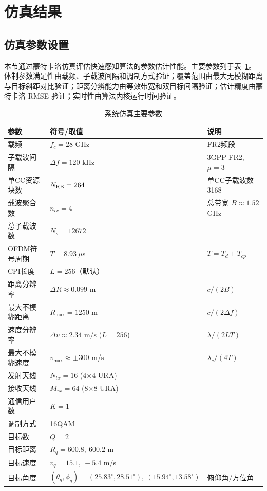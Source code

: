 \section{仿真结果}

\subsection{仿真参数设置}

本节通过蒙特卡洛仿真评估快速感知算法的参数估计性能。主要参数列于表~\ref{tab:sim_params}。
体制参数满足性由载频、子载波间隔和调制方式验证；覆盖范围由最大无模糊距离与目标斜距对比验证；距离分辨能力由等效带宽和双目标间隔验证；估计精度由蒙特卡洛 RMSE 验证；实时性由算法内核运行时间验证。

\begin{table}[H]
\centering
\caption{系统仿真主要参数}
\label{tab:sim_params}
\begin{tabular}{lll}
\toprule
\textbf{参数} & \textbf{符号/取值} & \textbf{说明} \\
\midrule
载频          & $f_c = 28$ GHz & FR2频段 \\
子载波间隔    & $\Delta f = 120$ kHz & 3GPP FR2, $\mu=3$ \\
单CC资源块数  & $N_{\rm RB}=264$ & 单CC子载波数3168 \\
载波聚合数    & $n_{cc}=4$ & 总带宽 $B\approx1.52$ GHz \\
总子载波数    & $N_s = 12672$ & \\
OFDM符号周期 & $T = 8.93\ \mu$s & $T=T_d+T_{cp}$ \\
CPI长度       & $L = 256$（默认） &  \\
距离分辨率    & $\Delta R \approx 0.099$ m & $c/(2B)$ \\
最大不模糊距离& $R_{\max}=1250$ m & $c/(2\Delta f)$ \\
速度分辨率    & $\Delta v \approx 2.34$ m/s ($L=256$) & $\lambda/(2LT)$ \\
最大不模糊速度& $v_{\max}\approx \pm 300$ m/s & $\lambda_c/(4T)$ \\
发射天线      & $N_{tx}=16$ (4$\times$4 URA) & \\
接收天线      & $M_{rx}=64$ (8$\times$8 URA) & \\
通信用户数    & $K=1$ & \\
调制方式      & 16QAM & \\
目标数        & $Q=2$ & \\
目标距离      & $R_q = 600.8,\ 600.2$ m & \\
目标速度      & $v_q = 15.1,\ -5.4$ m/s & \\
目标角度      & $(\theta_q,\phi_q) = (25.83^\circ,28.51^\circ),\ (15.94^\circ,13.58^\circ)$ & 俯仰角/方位角 \\
\bottomrule
\end{tabular}
\end{table}

